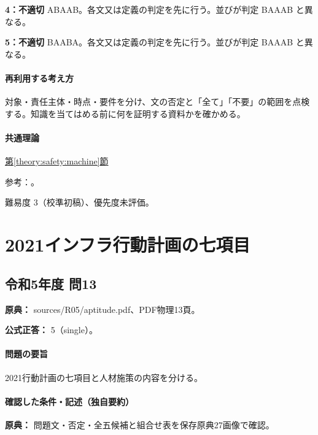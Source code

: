 \noindent\textbf{4：不適切} ABAAB。各文又は定義の判定を先に行う。並びが判定 BAAAB と異なる。\par

\noindent\textbf{5：不適切} BAABA。各文又は定義の判定を先に行う。並びが判定 BAAAB と異なる。\par

\paragraph{再利用する考え方} 対象・責任主体・時点・要件を分け、文の否定と「全て」「不要」の範囲を点検する。知識を当てはめる前に何を証明する資料かを確かめる。

\paragraph{共通理論} \hyperref[theory:safety:machine]{第\ref*{theory:safety:machine}節}

\par 参考：\cite{saf53_machine2007,saf_guide51}。

\par 難易度 3（校準初稿）、優先度未評価。

\section{2021インフラ行動計画の七項目}

\subsection{令和5年度 問13}
\label{q:r05-reg-apt-13}

\noindent\textbf{原典：} sources/R05/aptitude.pdf、PDF物理13頁。

\textbf{公式正答：} 5（single）。

\paragraph{問題の要旨} 2021行動計画の七項目と人材施策の内容を分ける。

\paragraph{確認した条件・記述（独自要約）}\mbox{}\par

\noindent\textbf{原典：} 問題文・否定・全五候補と組合せ表を保存原典27画像で確認。\par

